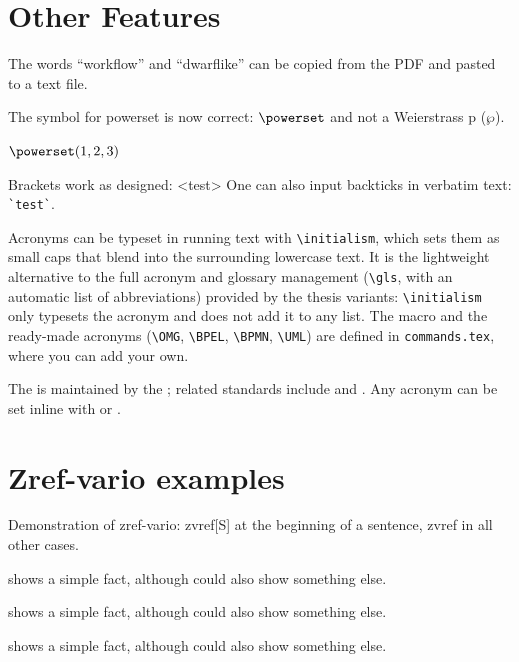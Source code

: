 
\section{Other Features}

\begin{ltgexample}
The words \enquote{workflow} and \enquote{dwarflike} can be copied from the PDF and pasted to a text file.
\end{ltgexample}

\begin{ltgexample}
The symbol for powerset is now correct: $\powerset$ and not a Weierstrass p ($\wp$).

$\powerset({1,2,3})$
\end{ltgexample}

\begin{ltgexample}
Brackets work as designed:
<test>
One can also input backticks in verbatim text: \verb|`test`|.
\end{ltgexample}

Acronyms can be typeset in running text with \verb+\initialism+, which sets them as small caps that blend into the surrounding lowercase text. It is the lightweight alternative to the full acronym and glossary management (\verb+\gls+, with an automatic list of abbreviations) provided by the thesis variants: \verb+\initialism+ only typesets the acronym and does not add it to any list. The macro and the ready-made acronyms (\verb+\OMG+, \verb+\BPEL+, \verb+\BPMN+, \verb+\UML+) are defined in \texttt{commands.tex}, where you can add your own.

\begin{ltgexample}
The \UML is maintained by the \OMG; related standards include \BPEL and \BPMN.
Any acronym can be set inline with  or .
\end{ltgexample}


\section{Zref-vario examples}
\label{sec:ex:vref}

Demonstration of zref-vario: zvref[S] at the beginning of a sentence, zvref in all other cases.

\begin{ltgexample}
 shows a simple fact, although  could also show something else.

 shows a simple fact, although  could also show something else.

 shows a simple fact, although  could also show something else.
\end{ltgexample}

